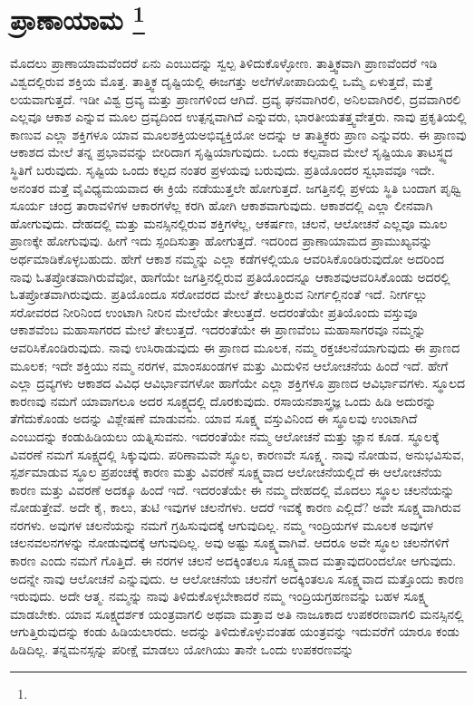 
\vspace{-0.8cm}

\chapter[ಪ್ರಾನಾಯಾಮ ]{ಪ್ರಾಣಾಯಾಮ \protect\footnote{}}

ಮೊದಲು ಪ್ರಾಣಾಯಾಮವೆಂದರೆ ಏನು ಎಂಬುದನ್ನು ಸ್ವಲ್ಪ ತಿಳಿದುಕೊಳ್ಳೋಣ. ತಾತ್ತ್ವಿಕವಾಗಿ ಪ್ರಾಣವೆಂದರೆ ಇಡಿ ವಿಶ್ವದಲ್ಲಿರುವ ಶಕ್ತಿಯ ಮೊತ್ತ. ತಾತ್ತ್ವಿಕ ದೃಷ್ಟಿಯಲ್ಲಿ ಈ\break ಜಗತ್ತು ಅಲೆಗಳೋಪಾದಿಯಲ್ಲಿ ಒಮ್ಮೆ ಏಳುತ್ತದೆ, ಮತ್ತೆ ಲಯವಾಗುತ್ತದೆ. ಇಡೀ ವಿಶ್ವ ದ್ರವ್ಯ ಮತ್ತು ಪ್ರಾಣಗಳಿಂದ ಆಗಿದೆ. ದ್ರವ್ಯ ಘನವಾಗಿರಲಿ, ಅನಿಲವಾಗಿರಲಿ, ದ್ರವವಾಗಿರಲಿ ಎಲ್ಲವೂ ಆಕಾಶ ಎನ್ನುವ ಮೂಲ ದ್ರವ್ಯದಿಂದ ಉತ್ಪನ್ನವಾಗಿದೆ ಎನ್ನುವರು, ಭಾರತೀಯ\break ತತ್ತ್ವವೇತ್ತರು. ನಾವು ಪ್ರಕೃತಿಯಲ್ಲಿ ಕಾಣುವ ಎಲ್ಲಾ ಶಕ್ತಿಗಳೂ ಯಾವ ಮೂಲಶಕ್ತಿಯ\break ಅಭಿವ್ಯಕ್ತಿಯೋ ಅದನ್ನು ಆ ತಾತ್ತ್ವಿಕರು ಪ್ರಾಣ ಎನ್ನುವರು. ಈ ಪ್ರಾಣವು ಆಕಾಶದ ಮೇಲೆ ತನ್ನ ಪ್ರಭಾವವನ್ನು ಬೀರಿದಾಗ ಸೃಷ್ಟಿಯಾಗುವುದು. ಒಂದು ಕಲ್ಪವಾದ ಮೇಲೆ ಸೃಷ್ಟಿಯೂ ತಾಟಸ್ಥ್ಯದ ಸ್ಥಿತಿಗೆ ಬರುವುದು. ಸೃಷ್ಟಿಯ ಒಂದು ಕಲ್ಪದ ನಂತರ ಪ್ರಳಯವು ಬರುವುದು. ಪ್ರತಿಯೊಂದರ ಸ್ವಭಾವವೂ ಇದೇ. ಅನಂತರ ಮತ್ತೆ ವೈವಿಧ್ಯಮಯವಾದ ಈ ಕ್ರಿಯೆ ನಡೆಯುತ್ತಲೇ ಹೋಗುತ್ತದೆ. ಜಗತ್ತಿನಲ್ಲಿ ಪ್ರಳಯ ಸ್ಥಿತಿ ಬಂದಾಗ ಪೃಥ್ವಿ ಸೂರ್ಯ ಚಂದ್ರ ತಾರಾವಳಿಗಳ ಆಕಾರಗಳೆಲ್ಲ ಕರಗಿ ಹೋಗಿ ಆಕಾಶವಾಗುವುದು. ಆಕಾಶದಲ್ಲಿ ಎಲ್ಲಾ ಲೀನವಾಗಿ ಹೋಗುವುದು. ದೇಹದಲ್ಲಿ ಮತ್ತು ಮನಸ್ಸಿನಲ್ಲಿರುವ ಶಕ್ತಿಗಳೆಲ್ಲ, ಆಕರ್ಷಣ, ಚಲನೆ, ಆಲೋಚನೆ ಎಲ್ಲವೂ ಮೂಲ ಪ್ರಾಣಕ್ಕೇ ಹೋಗುವುವು. ಹೀಗೆ ಇದು ಸ್ಪಂದಿಸುತ್ತಾ ಹೋಗುತ್ತದೆ. ಇದರಿಂದ ಪ್ರಾಣಾಯಾಮದ ಪ್ರಾಮುಖ್ಯವನ್ನು ಅರ್ಥಮಾಡಿಕೊಳ್ಳಬಹುದು. ಹೇಗೆ ಆಕಾಶ ನಮ್ಮನ್ನು ಎಲ್ಲಾ ಕಡೆಗಳಲ್ಲಿಯೂ ಆವರಿಸಿಕೊಂಡಿರುವುದೋ ಅದರಿಂದ ನಾವು ಓತಪ್ರೋತವಾಗಿರುವೆವೋ, ಹಾಗೆಯೇ ಜಗತ್ತಿನಲ್ಲಿರುವ ಪ್ರತಿಯೊಂದನ್ನೂ ಆಕಾಶವು\break ಆವರಿಸಿಕೊಂಡು ಅದರಲ್ಲಿ ಓತಪ್ರೋತವಾಗಿರುವುದು. ಪ್ರತಿಯೊಂದೂ ಸರೋವರದ ಮೇಲೆ ತೇಲುತ್ತಿರುವ ನೀರ್ಗಲ್ಲಿನಂತೆ ಇದೆ. ನೀರ್ಗಲ್ಲು ಸರೋವರದ ನೀರಿನಿಂದ ಉಂಟಾಗಿ ನೀರಿನ ಮೇಲೆಯೇ ತೇಲುತ್ತದೆ. ಅದರಂತೆಯೇ ಪ್ರತಿಯೊಂದು ವಸ್ತುವೂ ಆಕಾಶವೆಂಬ ಮಹಾಸಾಗರದ ಮೇಲೆ ತೇಲುತ್ತದೆ. ಇದರಂತೆಯೇ ಈ ಪ್ರಾಣವೆಂಬ ಮಹಾಸಾಗರವೂ ನಮ್ಮನ್ನು ಆವರಿಸಿಕೊಂಡಿರುವುದು. ನಾವು ಉಸಿರಾಡುವುದು ಈ ಪ್ರಾಣದ ಮೂಲಕ, ನಮ್ಮ ರಕ್ತಚಲನೆಯಾಗುವುದು ಈ ಪ್ರಾಣದ ಮೂಲಕ; ಇದೇ ಶಕ್ತಿಯು ನಮ್ಮ ನರಗಳ, ಮಾಂಸಖಂಡಗಳ ಮತ್ತು ಮಿದುಳಿನ ಆಲೋಚನೆಯ ಹಿಂದೆ ಇದೆ. ಹೇಗೆ ಎಲ್ಲಾ ದ್ರವ್ಯಗಳು ಆಕಾಶದ ವಿವಿಧ ಆವಿರ್ಭಾವಗಳೋ ಹಾಗೆಯೇ ಎಲ್ಲಾ ಶಕ್ತಿಗಳೂ ಪ್ರಾಣದ ಆವಿರ್ಭಾವಗಳು. ಸ್ಥೂಲದ ಕಾರಣವು ನಮಗೆ ಯಾವಾಗಲೂ ಅದರ ಸೂಕ್ಷ್ಮದಲ್ಲಿ ದೊರಕುವುದು. ರಸಾಯನಶಾಸ್ತ್ರಜ್ಞ ಒಂದು ಹಿಡಿ ಅದುರನ್ನು ತೆಗೆದುಕೊಂಡು ಅದನ್ನು ವಿಶ್ಲೇಷಣೆ ಮಾಡುವನು. ಯಾವ ಸೂಕ್ಷ್ಮ ವಸ್ತುವಿನಿಂದ ಈ ಸ್ಥೂಲವು ಉಂಟಾಗಿದೆ ಎಂಬುದನ್ನು ಕಂಡುಹಿಡಿಯಲು ಯತ್ನಿಸುವನು. ಇದರಂತೆಯೇ ನಮ್ಮ ಆಲೋಚನೆ ಮತ್ತು ಜ್ಞಾನ ಕೂಡ. ಸ್ಥೂಲಕ್ಕೆ ವಿವರಣೆ ನಮಗೆ ಸೂಕ್ಷ್ಮದಲ್ಲಿ ಸಿಕ್ಕುವುದು. ಪರಿಣಾಮವೇ ಸ್ಥೂಲ, ಕಾರಣವೇ ಸೂಕ್ಷ್ಮ. ನಾವು ನೋಡುವ, ಅನುಭವಿಸುವ, ಸ್ಪರ್ಶಮಾಡುವ ಸ್ಥೂಲ ಪ್ರಪಂಚಕ್ಕೆ ಕಾರಣ ಮತ್ತು ವಿವರಣೆ ಸೂಕ್ಷ್ಮವಾದ ಆಲೋಚನೆಯಲ್ಲಿದೆ ಈ ಆಲೋಚನೆಯ ಕಾರಣ ಮತ್ತು ವಿವರಣೆ ಅದಕ್ಕೂ ಹಿಂದೆ ಇದೆ. ಇದರಂತೆಯೇ ಈ ನಮ್ಮ ದೇಹದಲ್ಲಿ ಮೊದಲು ಸ್ಥೂಲ ಚಲನೆಯನ್ನು ನೋಡುತ್ತೇವೆ. ಅದೇ ಕೈ, ಕಾಲು, ತುಟಿ ಇವುಗಳ ಚಲನೆಗಳು. ಆದರೆ ಇವಕ್ಕೆ ಕಾರಣ ಎಲ್ಲಿದೆ? ಅವೇ ಸೂಕ್ಷ್ಮವಾಗಿರುವ ನರಗಳು. ಅವುಗಳ ಚಲನೆಯನ್ನು ನಮಗೆ ಗ್ರಹಿಸುವುದಕ್ಕೆ ಆಗುವುದಿಲ್ಲ. ನಮ್ಮ ಇಂದ್ರಿಯಗಳ ಮೂಲಕ ಅವುಗಳ ಚಲನವಲನಗಳನ್ನು ನೋಡುವುದಕ್ಕೆ ಆಗುವುದಿಲ್ಲ. ಅವು ಅಷ್ಟು ಸೂಕ್ಷ್ಮವಾಗಿವೆ. ಆದರೂ ಅವೇ ಸ್ಥೂಲ ಚಲನೆಗಳಿಗೆ ಕಾರಣ ಎಂದು ನಮಗೆ ಗೊತ್ತಿದೆ. ಈ ನರಗಳ ಚಲನೆ ಅದಕ್ಕಿಂತಲೂ ಸೂಕ್ಷ್ಮವಾದ ಮತ್ತಾವುದರಿಂದಲೋ ಆಗುವುದು. ಅದನ್ನೇ ನಾವು ಆಲೋಚನೆ ಎನ್ನುವುದು. ಆ ಆಲೋಚನೆಯ ಚಲನೆಗೆ ಅದಕ್ಕಿಂತಲೂ ಸೂಕ್ಷ್ಮವಾದ ಮತ್ತೊಂದು ಕಾರಣ ಇರುವುದು. ಅದೇ ಆತ್ಮ. ನಮ್ಮನ್ನು ನಾವು ತಿಳಿದುಕೊಳ್ಳಬೇಕಾದರೆ ನಮ್ಮ ಇಂದ್ರಿಯಗ್ರಹಣವನ್ನು ಬಹಳ ಸೂಕ್ಷ್ಮ ಮಾಡಬೇಕು. ಯಾವ ಸೂಕ್ಷ್ಮದರ್ಶಕ ಯಂತ್ರವಾಗಲಿ ಅಥವಾ ಮತ್ತಾವ ಅತಿ ನಾಜೂಕಾದ ಉಪಕರಣವಾಗಲಿ ಮನಸ್ಸಿನಲ್ಲಿ ಆಗುತ್ತಿರುವುದನ್ನು ಕಂಡು ಹಿಡಿಯಲಾರದು. ಅದನ್ನು ತಿಳಿದುಕೊಳ್ಳುವಂತಹ ಯಂತ್ರವನ್ನು ಇದುವರೆಗೆ ಯಾರೂ ಕಂಡು ಹಿಡಿದಿಲ್ಲ. ತನ್ನ\break ಮನಸ್ಸನ್ನು ಪರೀಕ್ಷೆ ಮಾಡಲು ಯೋಗಿಯು ತಾನೇ ಒಂದು ಉಪಕರಣವನ್ನು 
